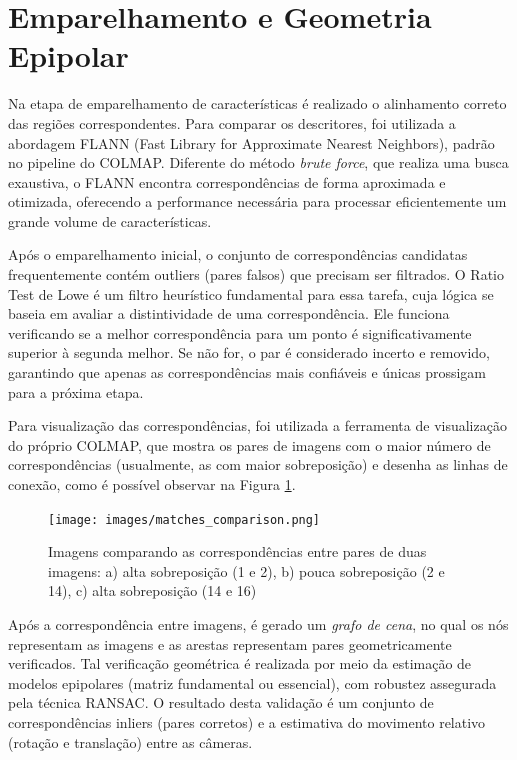 \documentclass[12pt]{article}
\begin{document}
\section{Emparelhamento e Geometria Epipolar}
Na etapa de emparelhamento de características  é realizado o alinhamento correto das regiões correspondentes. Para comparar os descritores, foi utilizada a abordagem FLANN (Fast Library for Approximate Nearest Neighbors), padrão no pipeline do COLMAP. Diferente do método \textit{brute force}, que realiza uma busca exaustiva, o FLANN encontra correspondências de forma aproximada e otimizada, oferecendo a performance necessária para processar eficientemente um grande volume de características.

Após o emparelhamento inicial, o conjunto de correspondências candidatas frequentemente contém outliers (pares falsos) que precisam ser filtrados. O Ratio Test de Lowe é um filtro heurístico fundamental para essa tarefa, cuja lógica se baseia em avaliar a distintividade de uma correspondência.
Ele funciona verificando se a melhor correspondência para um ponto é significativamente superior à segunda melhor. Se não for, o par é considerado incerto e removido, garantindo que apenas as correspondências mais confiáveis e únicas prossigam para a próxima etapa.

Para visualização das correspondências, foi utilizada a ferramenta de visualização do próprio COLMAP, que mostra os pares de imagens com o maior número de correspondências (usualmente, as com maior sobreposição) e desenha as linhas de conexão, como é possível observar na Figura \ref{fig:matches}.

\begin{figure}[h!]
\centering
\texttt{[image: images/matches\_comparison.png]}
\caption{Imagens comparando as correspondências entre pares de duas imagens: a) alta sobreposição (1 e 2), b) pouca sobreposição (2 e 14), c) alta sobreposição (14 e 16)}
\label{fig:matches}
\end{figure}

Após a correspondência entre imagens, é gerado um \textit{grafo de cena}, no qual os nós representam as imagens e as arestas representam pares geometricamente verificados. Tal verificação geométrica é realizada por meio da estimação de modelos epipolares (matriz fundamental ou essencial), com robustez assegurada pela técnica RANSAC. O resultado desta validação é um conjunto de correspondências inliers (pares corretos) e a estimativa do movimento relativo (rotação e translação) entre as câmeras.
\end{document}
